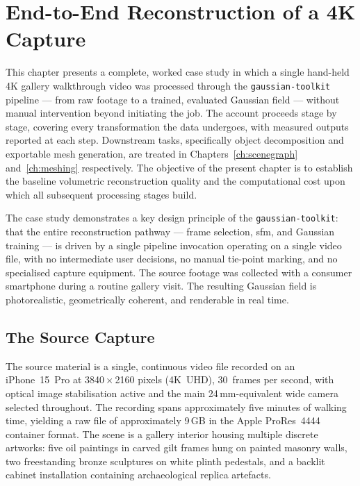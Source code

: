 \chapter{End-to-End Reconstruction of a 4K Capture}
\label{ch:reconstruction}

This chapter presents a complete, worked case study in which a single hand-held 4K gallery walkthrough video was processed through the \texttt{gaussian-toolkit} pipeline — from raw footage to a trained, evaluated Gaussian field — without manual intervention beyond initiating the job. The account proceeds stage by stage, covering every transformation the data undergoes, with measured outputs reported at each step. Downstream tasks, specifically object decomposition and exportable mesh generation, are treated in Chapters~\ref{ch:scenegraph} and~\ref{ch:meshing} respectively. The objective of the present chapter is to establish the baseline volumetric reconstruction quality and the computational cost upon which all subsequent processing stages build.

The case study demonstrates a key design principle of the \texttt{gaussian-toolkit}: that the entire reconstruction pathway — frame selection, \acrshort{sfm}, and Gaussian training — is driven by a single pipeline invocation operating on a single video file, with no intermediate user decisions, no manual tie-point marking, and no specialised capture equipment. The source footage was collected with a consumer smartphone during a routine gallery visit. The resulting Gaussian field is photorealistic, geometrically coherent, and renderable in real time.

\section{The Source Capture}
\label{sec:recon-capture}

The source material is a single, continuous video file recorded on an iPhone~15~Pro at 3840\,×\,2160 pixels (4K~UHD), 30~frames per second, with optical image stabilisation active and the main 24\,mm-equivalent wide camera selected throughout. The recording spans approximately five minutes of walking time, yielding a raw file of approximately 9\,GB in the Apple ProRes~4444 container format. The scene is a gallery interior housing multiple discrete artworks: five oil paintings in carved gilt frames hung on painted masonry walls, two freestanding bronze sculptures on white plinth pedestals, and a backlit cabinet installation containing archaeological replica artefacts.

